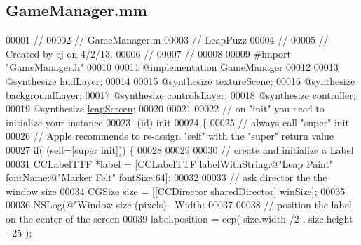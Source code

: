 \hypertarget{_game_manager_8mm}{\subsection{Game\-Manager.\-mm}
\label{df/de3/_game_manager_8mm}
}

\begin{DoxyCode}
00001 \textcolor{comment}{//}
00002 \textcolor{comment}{//  GameManager.m}
00003 \textcolor{comment}{//  LeapPuzz}
00004 \textcolor{comment}{//}
00005 \textcolor{comment}{//  Created by cj on 4/2/13.}
00006 \textcolor{comment}{//}
00007 \textcolor{comment}{//}
00008 
00009 \textcolor{preprocessor}{#import "GameManager.h"}
00010 
00011 \textcolor{keyword}{@implementation }\hyperlink{interface_game_manager}{GameManager}
00012 
00013 \textcolor{keyword}{@synthesize} \hyperlink{interface_game_manager_ae286fb2f9d31810d73c7231a574b56b0}{hudLayer};
00014 
00015 \textcolor{keyword}{@synthesize} \hyperlink{interface_game_manager_a79a86ff991f39b3007d99ca61af21253}{textureScene};
00016 \textcolor{keyword}{@synthesize} \hyperlink{interface_game_manager_a2a3a96f1202b13592f244cf1402b4051}{backgroundLayer};
00017 \textcolor{keyword}{@synthesize} \hyperlink{interface_game_manager_a0ee5903be06e4a676ddde4c1f03530a7}{controlsLayer};
00018 \textcolor{keyword}{@synthesize} \hyperlink{interface_game_manager_a4b089253ae3569099d28535b128f3436}{controller};
00019 \textcolor{keyword}{@synthesize} \hyperlink{interface_game_manager_a85cb30e21c987f66855a762c6ba88096}{leapScreen};
00020 
00021 
00022 \textcolor{comment}{// on "init" you need to initialize your instance}
00023 -(id) init
00024 \{
00025     \textcolor{comment}{// always call "super" init}
00026     \textcolor{comment}{// Apple recommends to re-assign "self" with the "super" return value}
00027     \textcolor{keywordflow}{if}( (\textcolor{keyword}{self}=[super init])) \{
00028         
00029                 
00030         \textcolor{comment}{// create and initialize a Label}
00031         CCLabelTTF *label = [CCLabelTTF labelWithString:@"Leap Paint" fontName:@"Marker Felt" fontSize:64];
00032         
00033         \textcolor{comment}{// ask director the the window size}
00034         CGSize size = [[CCDirector sharedDirector] winSize];
00035         
00036         NSLog(\textcolor{stringliteral}{@"Window size (pixels)-- Width: %
00037         
00038         \textcolor{comment}{// position the label on the center of the screen}
00039         label.position =  ccp( size.width /2 , size.height - 25 );
}
\end{DoxyCode}
